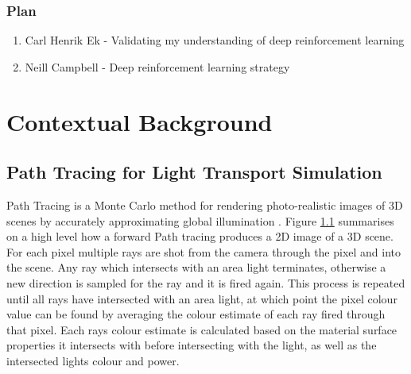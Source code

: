 \documentclass[ %
                    author={Callum Pearce},
                supervisor={Dr. Neill Campbell},
                    degree={MEng},
                     title={How effective are Temporal difference learning methods for reducing the number of zero contribution light paths while still accurately approximating Global Illumination in Path tracing?},
                  subtitle={},
                      type={research},
                      year={2019} ]{dissertation}
\begin{document}
\subsection{Plan}
\begin{enumerate}
\item Carl Henrik Ek - Validating my understanding of deep reinforcement learning
\item Neill Campbell - Deep reinforcement learning strategy
\end{enumerate}


%

\mainmatter


\chapter{Contextual Background}
\label{chap:context}

\section{Path Tracing for Light Transport Simulation}
Path Tracing is a Monte Carlo method for rendering photo-realistic images of 3D 
scenes by accurately approximating global illumination \cite{christensen2016path}.
Figure \ref{} summarises on a high level how a forward Path tracing produces a 
2D image of a 3D scene. For each pixel multiple rays are shot from the camera through the 
pixel and into the scene. Any ray which intersects with an area light terminates, 
otherwise a new direction is sampled for the ray and it is fired again. This process 
is repeated until all rays have intersected with an area light, at which point the pixel 
colour value can  be found by averaging the colour estimate of each ray fired 
through that pixel. Each rays colour estimate is calculated based on the material 
surface properties it intersects with before intersecting with the light, as well as the
intersected lights colour and power.\\
\end{document}
